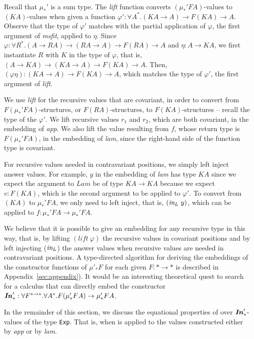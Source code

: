 Recall that $\mu_{*}'$ is a sum type. The \textit{lift} function converts
$(\mu_{*}'FA)$-values to $(KA)$-values when given a function
$\varphi' : \forall A^{*}.(KA \to A) \to F(K A) \to A$.
Observe that the type of $\varphi'$ matches with the partial application of
$\varphi$, the first argument of \textit{msfit}, applied to $\eta$. Since
$\varphi : \forall R^{*}.(A \to R A) \to (R A \to A) \to F(R A) \to A$
and $\eta : A \to K A$, we first instantiate $R$ with $K$ in the type of
$\varphi$, that is, $(A \to K A) \to (K A \to A) \to F(K A) \to A$.
Then, $(\varphi\eta) : (K A \to A) \to F(K A) \to A$, which matches
the type of $\varphi'$, the first argument of \textit{lift}.

We use \textit{lift} for the recursive values that are covariant,
in order to convert from $F(\mu_{*}'FA)$-structures, or $F(RA)$-structures,
to $F(KA)$-structures -- recall the type of the $\varphi'$.
We lift recursive values $r_1$ and $r_2$, which are both covariant,
in the embedding of \textit{app}. We also lift the value resulting from $f$,
whose return type is $F(\mu_{*}'FA)$, in the embedding of \textit{lam},
since the right-hand side of the function type is covariant.

For recursive values needed in contravariant positions, we simply left inject
answer values. For example, $y$ in the embedding of \textit{lam} has type $KA$
since we expect the argument to $Lam$ be of type $KA \to KA$
because we expect $v : F(KA)$, which is the second argument to be
applied to $\varphi'$. To convert from $(KA)$ to $\mu_{*}'FA$,
we only need to left inject, that is, $(\textit{in}_{L}~y)$,
which can be applied to $f : \mu_{*}'FA \to \mu_{*}'FA$.

We believe that it is possible to give an embedding for any recursive type
in this way, that is, by lifting $(\textit{lift}~\varphi)$ the recursive values
in covariant positions and by left injecting ($\textit{in}_{L}$) the answer values
when recursive values are needed in contravariant positions. A type-directed
algorithm for deriving the embeddings of the constructor functions of
$\mu'_{*} F$ for each given $F : * \to *$ is described
in Appendix~\ref{sec:appendix}). It would be an interesting theoretical quest
to search for a calculus that can directly embed the constructor
$\textbf{\textit{In}}_{*}' : \forall F^{*\to*}.\forall A^{*}.F(\mu'_{*} F A) \to \mu'_{*} F A$.

In the remainder of this section, we discuss the equational properties
of \msfit{*} over $\textbf{\textit{In}}_{*}'$-values of the type \lstinline{Exp}. That is,
when \msfit{*} is applied to the values constructed either by \textit{app}
or by \textit{lam}.

